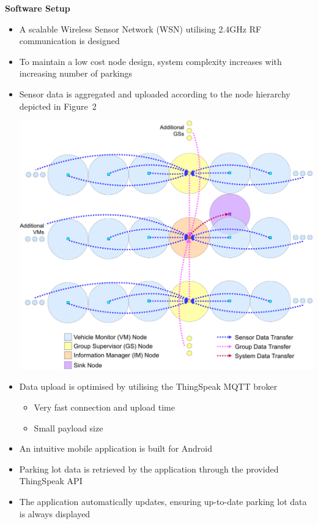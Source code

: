 \documentclass[landscape,a1paper,fontscale=0.47]{baposter} %
\newcommand{\compresslist}{ %
\setlength{\itemsep}{1pt}
\setlength{\parskip}{0pt}
\setlength{\parsep}{0pt}
}
\begin{document}
\begin{poster}
{\begin{multicols}{2}
		\textbf{Software Setup}
			\begin{itemize}[leftmargin=13pt]\compresslist
				\item A scalable Wireless Sensor Network (WSN) utilising 2.4GHz RF communication is designed
				\item To maintain a low cost node design, system complexity increases with increasing number of parkings
				\item Sensor data is aggregated and uploaded according to the node hierarchy depicted in Figure~2
				\begin{center}
					\includegraphics[width=0.84\columnwidth]{mesh-cropped}
				\end{center}
			\vspace{0.5mm}
				\item Data upload is optimised by utilising the ThingSpeak MQTT broker
					\begin{itemize}[leftmargin=13pt]\compresslist
						\item Very fast connection and upload time
						\item Small payload size
					\end{itemize}
				\item An intuitive mobile application is built for Android
				\item Parking lot data is retrieved by the application through the provided ThingSpeak API
				\item The application automatically updates, ensuring up-to-date parking lot data is always displayed 
			\end{itemize}
		

\end{multicols}}
\end{poster}
\end{document}
